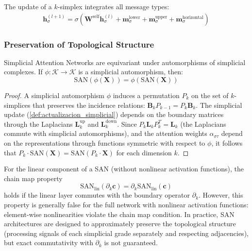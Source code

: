 \begin{definition}\label{def:actualizacion_simplicial}
The update of a $k$-simplex integrates all message types:
\begin{align}
    \mathbf{h}_{\sigma}^{(l+1)} = \sigma\left(\mathbf{W}^{\text{self}} \mathbf{h}_{\sigma}^{(l)} + \mathbf{m}_{\sigma}^{\text{lower}} + \mathbf{m}_{\sigma}^{\text{upper}} + \mathbf{m}_{\sigma}^{\text{horizontal}}\right)
\end{align}
\end{definition}

\subsubsection{Preservation of Topological Structure}

\begin{theorem}\label{thm:equivarianza_simplicial}
Simplicial Attention Networks are equivariant under automorphisms of simplicial complexes. If $\phi: \mathcal{K} \to \mathcal{K}$ is a simplicial automorphism, then:
\begin{equation}
    \text{SAN}(\phi(\mathbf{X})) = \phi(\text{SAN}(\mathbf{X}))
\end{equation}
\end{theorem}

\begin{proof}
A simplicial automorphism $\phi$ induces a permutation $P_k$ on the set of $k$-simplices that preserves the incidence relations: $\mathbf{B}_k P_{k-1} = P_k \mathbf{B}_k$. The simplicial update (\autoref{def:actualizacion_simplicial}) depends on the boundary matrices through the Laplacians $\mathbf{L}_k^{\text{up}}$ and $\mathbf{L}_k^{\text{down}}$. Since $P_k \mathbf{L}_k P_k^T = \mathbf{L}_k$ (the Laplacians commute with simplicial automorphisms), and the attention weights $\alpha_{\sigma\tau}$ depend on the representations through functions symmetric with respect to $\phi$, it follows that $P_k \cdot \text{SAN}(\mathbf{X}) = \text{SAN}(P_k \cdot \mathbf{X})$ for each dimension $k$.
\end{proof}

\begin{remark}\label{rem:respeto_estructura_cadenas}
For the linear component of a SAN (without nonlinear activation functions), the chain map property
\begin{equation}
    \text{SAN}_{\text{lin}}(\partial_k \mathbf{c}) = \partial_k \text{SAN}_{\text{lin}}(\mathbf{c})
\end{equation}
holds if the linear layer commutes with the boundary operator $\partial_k$. However, this property is generally false for the full network with nonlinear activation functions: element-wise nonlinearities violate the chain map condition. In practice, SAN architectures are designed to approximately preserve the topological structure (processing signals of each simplicial grade separately and respecting adjacencies), but exact commutativity with $\partial_k$ is not guaranteed.
\end{remark}

